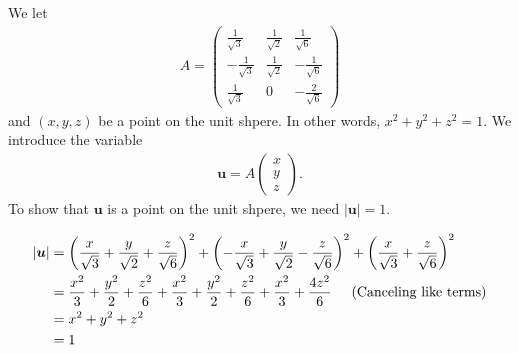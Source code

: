 \documentclass[a4paper,10pt,english]{article}
\begin{document}
\subsection{} \label{2a}
We let 
\begin{align}
    A = 
    \begin{pmatrix}
        \frac{1}{\sqrt 3} & \frac{1}{\sqrt 2} & \frac{1}{\sqrt 6} \\
        - \frac{1}{\sqrt 3} & \frac{1}{\sqrt 2} & - \frac{1}{\sqrt 6} \\
        \frac{1}{\sqrt 3} & 0 & - \frac{2}{\sqrt 6}
    \end{pmatrix}
\end{align}
and $(x, y, z)$ be a point on the unit shpere. In other words, $x^2 + y^2 + z^2 = 1$. We introduce the variable
\begin{align*}
    \bm{u} = A 
    \begin{pmatrix}
        x\\ 
        y\\ 
        z
    \end{pmatrix}.
\end{align*}
To show that $\bm{u}$ is a point on the unit shpere, we need $|\bm{u}|=1$.

\begin{align*}
    |\bm{u}| &= 
    \left( 
        \frac{x}{\sqrt 3} + \frac{y}{\sqrt 2} + \frac{z}{\sqrt6}
    \right)^2
    + \left( 
        - \frac{x}{\sqrt 3} + \frac{y}{\sqrt 2} - \frac{z}{\sqrt6}
    \right)^2
    + \left( 
        \frac{x}{\sqrt 3} + \frac{z}{\sqrt6}
    \right)^2 \\
    &= \frac{x^2}{3} + \frac{y^2}{2} + \frac{z^2}{6}
    + \frac{x^2}{3} + \frac{y^2}{2} + \frac{z^2}{6}
    + \frac{x^2}{3} + \frac{4z^2}{6} 
    \hspace{0.5cm} \text{(Canceling like terms)}\\
    &= x^2 + y^2 + z^2 \\
    &= 1
\end{align*}

\subsection{} \label{2b}
\end{document}
